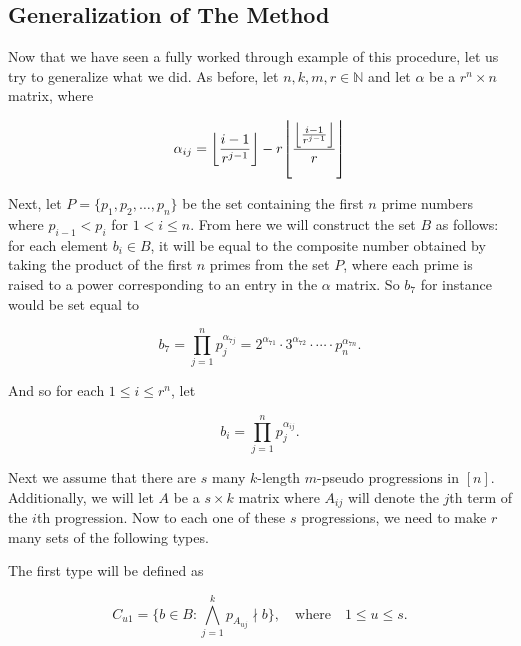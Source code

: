 \documentclass{article}
\DeclarePairedDelimiter\floor{\lfloor}{\rfloor}
\theoremstyle{definition}
\theoremstyle{remark}
\theoremstyle{definition}
\begin{document}
\subsection{Generalization of The Method}
    
Now that we have seen a fully worked through example of this procedure, let us try to generalize what we did. As before, let $n,k,m,r\in\mathbb{N}$ and let $\alpha$ be a $r^n\times n$ matrix, where 
    
\begin{equation*}
    \alpha_{ij} = \floor*{\frac{i-1}{r^{j-1}}}-r\floor*{\frac{\floor*{\frac{i-1}{r^{j-1}}}}{r}}
\end{equation*}
    
\noindent Next, let $P=\{p_1,p_2,\dots,p_n\}$ be the set containing the first $n$ prime numbers where $p_{i-1}<p_i$ for $1<i\leq n$. From here we will construct the set $B$ as follows: for each element $b_i\in B$, it will be equal to the composite number obtained by taking the product of the first $n$ primes from the set $P$, where each prime is raised to a power corresponding to an entry in the $\alpha$ matrix. So $b_7$ for instance would be set equal to 
    
\begin{equation*}
    b_7 = \prod\limits_{j=1}^n p_j^{\alpha_{7j}} = 2^{\alpha_{71}}\cdot 3^{\alpha_{72}}\cdot\cdots\cdot p_n^{\alpha_{7n}}.
\end{equation*}
    
\noindent And so for each $1\leq i \leq r^n$, let 
    
\begin{equation*}
    b_i = \prod\limits_{j=1}^n p_j^{\alpha_{ij}}.
\end{equation*}
    
\noindent Next we assume that there are $s$ many $k$-length $m$-pseudo progressions in $[n]$. Additionally, we will let $A$ be a $s\times k$ matrix where $A_{ij}$ will denote the $j$th term of the $i$th progression. Now to each one of these $s$ progressions, we need to make $r$ many sets of the following types.
    
\newpage
    
\noindent The first type will be defined as 
    
\begin{equation*}
    C_{u1} = \{b\in B\colon \bigwedge\limits_{j=1}^k p_{A_{uj}}\nmid b\}, \quad\text{where}\quad 1\leq u\leq s.
\end{equation*}
    
\end{document}
